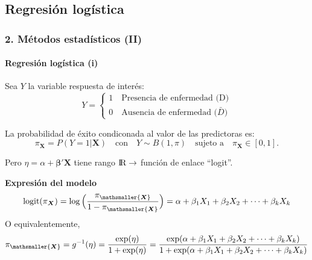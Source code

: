 \documentclass{beamer}
\begin{document}
\subsection{Regresión logística}
\begin{frame}
	\frametitle{2. Métodos estadísticos (II)}
	\framesubtitle{Regresión logística (i)}

Sea $Y$ la variable respuesta de interés:
	\vspace{-0.25cm}
	\small
	$$Y= \left\{\begin{array}{l}1 \quad \text{Presencia de enfermedad (D)}\\
	0 \quad \text{Ausencia de enfermedad ($\bar{D}$)}\end{array}\right.$$
	\normalsize
	
	La probabilidad de éxito condiconada al valor de las predictoras es:
	\small $$\pi_{\boldsymbol{X}}=P(Y=1|\boldsymbol{X}) \quad \text{con} \quad Y \sim B(1,\pi) \quad \text{sujeto a} \quad \pi_{\boldsymbol{X}} \in [0,1].$$
	\normalsize
	
	Pero $\eta = \alpha+ \boldsymbol{\beta'X}$ tiene rango ${\rm I\!R} \rightarrow$  {\color{green!55!blue} función de enlace ``logit''}.
	
	\begin{block}{\textbf{Expresión del modelo}}
	\small
		$$ \text{logit}(\pi_{\boldsymbol{X}}) =\log \Big( \frac{\pi_{\mathsmaller{\boldsymbol{X}}}}{1-\pi_{\mathsmaller{\boldsymbol{X}}}} \Big)= \alpha + \beta_1X_1 + \beta_2X_2 + \cdots + \beta_kX_k$$
	O equivalentemente, 
		$$\pi_{\mathsmaller{\boldsymbol{X}}}=g^{-1}(\eta)=\frac{\exp(\eta)}{1+\exp(\eta)}=\frac{\exp(\alpha + \beta_1X_1 + \beta_2X_2 + \cdots + \beta_kX_k)}{1+\exp(\alpha + \beta_1X_1 + \beta_2X_2 + \cdots + \beta_kX_k)}$$
	\normalsize
	\end{block}
\end{frame}
\end{document}
